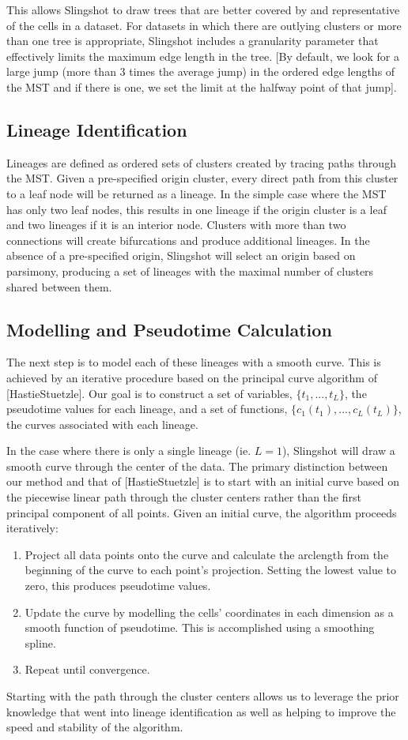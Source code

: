 \documentclass[11pt]{article}\usepackage[]{graphicx}\usepackage[]{color}
\begin{document}
This allows Slingshot to draw trees that are better covered by and representative of the cells in a dataset. For datasets in which there are outlying clusters or more than one tree is appropriate, Slingshot includes a granularity parameter that effectively limits the maximum edge length in the tree. [By default, we look for a large jump (more than 3 times the average jump) in the ordered edge lengths of the MST and if there is one, we set the limit at the halfway point of that jump]. 

\subsection{Lineage Identification}
Lineages are defined as ordered sets of clusters created by tracing paths through the MST. Given a pre-specified origin cluster, every direct path from this cluster to a leaf node will be returned as a lineage. In the simple case where the MST has only two leaf nodes, this results in one lineage if the origin cluster is a leaf and two lineages if it is an interior node. Clusters with more than two connections will create bifurcations and produce additional lineages. In the absence of a pre-specified origin, Slingshot will select an origin based on parsimony, producing a set of lineages with the maximal number of clusters shared between them.

\subsection{Modelling and Pseudotime Calculation}
The next step is to model each of these lineages with a smooth curve. This is achieved by an iterative procedure based on the principal curve algorithm of [HastieStuetzle]. Our goal is to construct a set of variables, $\{t_1,...,t_L\}$, the pseudotime values for each lineage, and a set of functions, $\{c_1(t_1),...,c_L(t_L)\}$, the curves associated with each lineage.

In the case where there is only a single lineage (ie. $L = 1$), Slingshot will draw a smooth curve through the center of the data. The primary distinction between our method and that of [HastieStuetzle] is to start with an initial curve based on the piecewise linear path through the cluster centers rather than the first principal component of all points. Given an initial curve, the algorithm proceeds iteratively:
\begin{enumerate}[font={\bfseries}]
\item Project all data points onto the curve and calculate the arclength from the beginning of the curve to each point's projection. Setting the lowest value to zero, this produces pseudotime values.
\item Update the curve by modelling the cells' coordinates in each dimension as a smooth function of pseudotime. This is accomplished using a smoothing spline.
\item Repeat until convergence.
\end{enumerate}
Starting with the path through the cluster centers allows us to leverage the prior knowledge that went into lineage identification as well as helping to improve the speed and stability of the algorithm.
\end{document}
